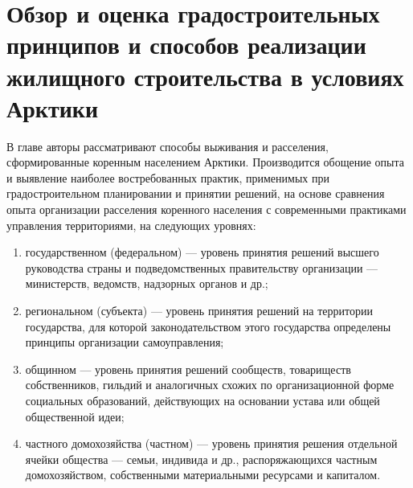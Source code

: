 \chapter{Обзор и оценка градостроительных принципов и способов реализации жилищного строительства в условиях Арктики}
В главе авторы рассматривают способы выживания и расселения, сформированные коренным населением Арктики.
Производится обощение опыта и выявление наиболее востребованных практик, применимых при градостроительном планировании и принятии решений,
на основе сравнения опыта организации расселения коренного населения с современными практиками управления территориями, на следующих уровнях:
\begin{enumerate}[1)]
    \item государственном (федеральном) — уровень принятия решений высшего руководства страны и подведомственных правительству организации — министерств, ведомств, надзорных органов и др.;
    \item региональном (субъекта) — уровень принятия решений на территории государства, для которой законодательством этого государства определены принципы организации самоуправления;
    \item общинном — уровень принятия решений сообществ, товариществ собственников, гильдий и аналогичных схожих по организационной форме
    социальных образований, действующих на основании устава или общей общественной идеи;
    \item частного домохозяйства (частном) — уровень принятия решения отдельной ячейки общества — семьи, индивида и др., распоряжающихся частным
    домохозяйством, собственными материальными ресурсами и капиталом.
\end{enumerate}







